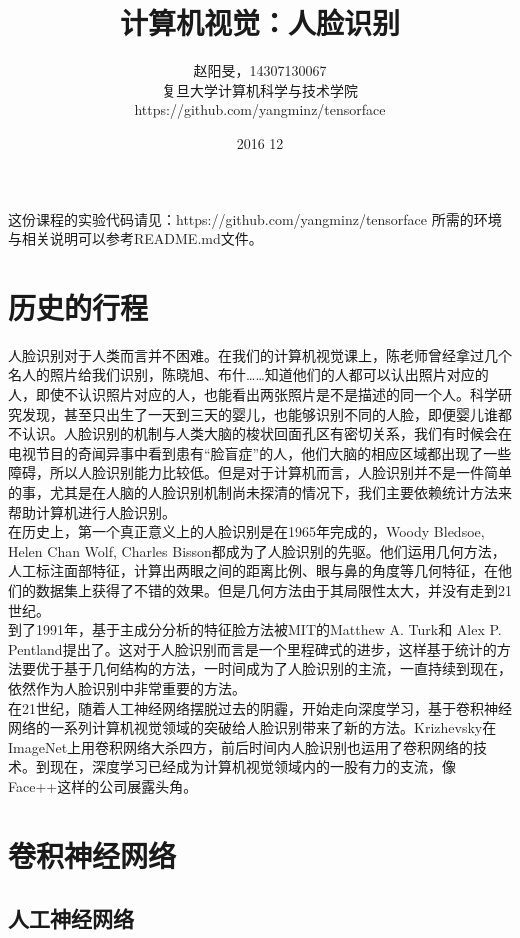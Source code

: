 \documentclass[12pt]{article}
\title{计算机视觉：人脸识别}
\author{赵阳旻，14307130067\\复旦大学计算机科学与技术学院\\https://github.com/yangminz/tensorface}
\date{2016 12}
\begin{document}
\maketitle
\tableofcontents

\bigskip
这份课程的实验代码请见：https://github.com/yangminz/tensorface 所需的环境与相关说明可以参考README.md文件。

\section{历史的行程}

人脸识别对于人类而言并不困难。在我们的计算机视觉课上，陈老师曾经拿过几个名人的照片给我们识别，陈晓旭、布什……知道他们的人都可以认出照片对应的人，即使不认识照片对应的人，也能看出两张照片是不是描述的同一个人。科学研究发现，甚至只出生了一天到三天的婴儿，也能够识别不同的人脸，即便婴儿谁都不认识。人脸识别的机制与人类大脑的梭状回面孔区有密切关系，我们有时候会在电视节目的奇闻异事中看到患有“脸盲症”的人，他们大脑的相应区域都出现了一些障碍，所以人脸识别能力比较低。但是对于计算机而言，人脸识别并不是一件简单的事，尤其是在人脑的人脸识别机制尚未探清的情况下，我们主要依赖统计方法来帮助计算机进行人脸识别。\\

在历史上，第一个真正意义上的人脸识别是在1965年完成的，Woody Bledsoe, Helen Chan Wolf, Charles Bisson都成为了人脸识别的先驱。他们运用几何方法，人工标注面部特征，计算出两眼之间的距离比例、眼与鼻的角度等几何特征，在他们的数据集上获得了不错的效果。但是几何方法由于其局限性太大，并没有走到21世纪。\\

到了1991年，基于主成分分析的特征脸方法被MIT的Matthew A. Turk和 Alex P. Pentland提出了。这对于人脸识别而言是一个里程碑式的进步，这样基于统计的方法要优于基于几何结构的方法，一时间成为了人脸识别的主流，一直持续到现在，依然作为人脸识别中非常重要的方法。\\

在21世纪，随着人工神经网络摆脱过去的阴霾，开始走向深度学习，基于卷积神经网络的一系列计算机视觉领域的突破给人脸识别带来了新的方法。Krizhevsky在ImageNet上用卷积网络大杀四方，前后时间内人脸识别也运用了卷积网络的技术。到现在，深度学习已经成为计算机视觉领域内的一股有力的支流，像Face++这样的公司展露头角。

\section{卷积神经网络}

\subsection{人工神经网络}
\end{document}
